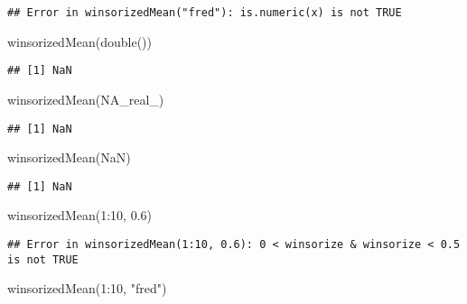 \documentclass[
]{article}
\newenvironment{Shaded}{\begin{snugshade}}{\end{snugshade}}
\newcommand{\ConstantTok}[1]{\textcolor[rgb]{0.00,0.00,0.00}{#1}}
\newcommand{\DecValTok}[1]{\textcolor[rgb]{0.00,0.00,0.81}{#1}}
\newcommand{\FloatTok}[1]{\textcolor[rgb]{0.00,0.00,0.81}{#1}}
\newcommand{\FunctionTok}[1]{\textcolor[rgb]{0.00,0.00,0.00}{#1}}
\newcommand{\NormalTok}[1]{#1}
\newcommand{\SpecialCharTok}[1]{\textcolor[rgb]{0.00,0.00,0.00}{#1}}
\newcommand{\StringTok}[1]{\textcolor[rgb]{0.31,0.60,0.02}{#1}}
\begin{document}
\begin{verbatim}
## Error in winsorizedMean("fred"): is.numeric(x) is not TRUE
\end{verbatim}

\begin{Shaded}
\begin{Highlighting}[]
\FunctionTok{winsorizedMean}\NormalTok{(}\FunctionTok{double}\NormalTok{())}
\end{Highlighting}
\end{Shaded}

\begin{verbatim}
## [1] NaN
\end{verbatim}

\begin{Shaded}
\begin{Highlighting}[]
\FunctionTok{winsorizedMean}\NormalTok{(}\ConstantTok{NA\_real\_}\NormalTok{)}
\end{Highlighting}
\end{Shaded}

\begin{verbatim}
## [1] NaN
\end{verbatim}

\begin{Shaded}
\begin{Highlighting}[]
\FunctionTok{winsorizedMean}\NormalTok{(}\ConstantTok{NaN}\NormalTok{)}
\end{Highlighting}
\end{Shaded}

\begin{verbatim}
## [1] NaN
\end{verbatim}

\begin{Shaded}
\begin{Highlighting}[]
\FunctionTok{winsorizedMean}\NormalTok{(}\DecValTok{1}\SpecialCharTok{:}\DecValTok{10}\NormalTok{, }\FloatTok{0.6}\NormalTok{)}
\end{Highlighting}
\end{Shaded}

\begin{verbatim}
## Error in winsorizedMean(1:10, 0.6): 0 < winsorize & winsorize < 0.5 is not TRUE
\end{verbatim}

\begin{Shaded}
\begin{Highlighting}[]
\FunctionTok{winsorizedMean}\NormalTok{(}\DecValTok{1}\SpecialCharTok{:}\DecValTok{10}\NormalTok{, }\StringTok{"fred"}\NormalTok{)}
\end{Highlighting}
\end{Shaded}
\end{document}
